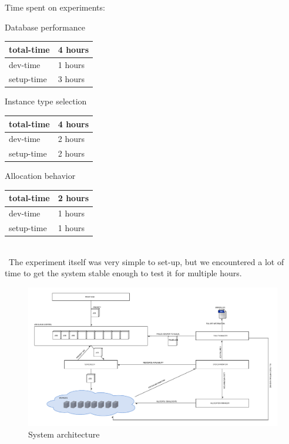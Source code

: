 \documentclass[a4paper]{IEEEtran}
\begin{document}
Time spent on experiments:
\begin{LaTeXdescription}
\item[Database performance] \ \\
\begin{tabular}{| l | l |}
\hline
total-time & 4 hours \\ \hline
dev-time & 1 hours \\ \hline
setup-time & 3 hours \\ \hline
\end{tabular}
\item[Instance type selection] \ \\
\begin{tabular}{| l | l |}
\hline
total-time & 4 hours \\ \hline
dev-time & 2 hours \\ \hline
setup-time & 2 hours \\ \hline
\end{tabular}
\item[Allocation behavior] \ \\
\begin{tabular}{| l | l |}
\hline
total-time & 2 hours \\ \hline
dev-time & 1 hours \\ \hline
setup-time & 1 hours \\ \hline
\end{tabular}
\\\ 
The experiment itself was very simple to set-up, but we encountered a lot of time to get the system stable enough to test it for multiple hours.
\end{LaTeXdescription}


\begin{landscape}
\appendix

\begin{figure}[h]
\centering
\includegraphics[width=700pt]{"System Architecture 2"}
\caption{System architecture}
\label{fig_sysarch}
\end{figure}
\end{landscape}
\clearpage
\end{document}
